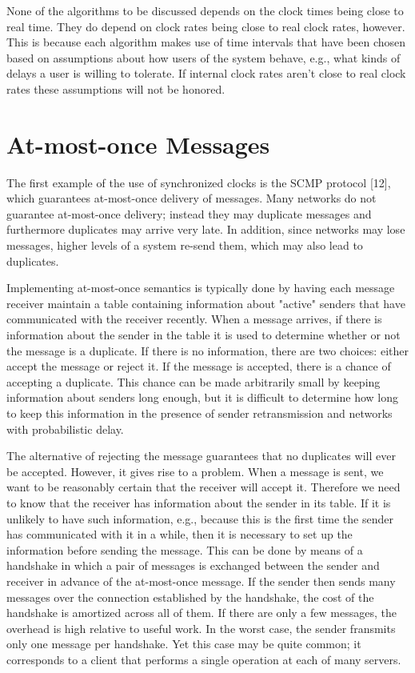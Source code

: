 \documentclass[a4paper,11pt,notitlepage,twoside,openright]{article}
\begin{document}
None of the algorithms to be discussed depends on the clock times being
close to real time. They do depend on clock rates being close to real
clock rates, however. This is because each algorithm makes use of time
intervals that have been chosen based on assumptions about how users of
the system behave, e.g., what kinds of delays a user is willing to
tolerate. If internal clock rates aren't close to real clock rates these
assumptions will not be honored.


\hypertarget{at-most-once-messages}{%
\section{At-most-once Messages}\label{at-most-once-messages}}


The first example of the use of synchronized clocks is the SCMP protocol
{[}12{]}, which guarantees at-most-once delivery of messages. Many
networks do not guarantee at-most-once delivery; instead they may
duplicate messages and furthermore duplicates may arrive very late. In
addition, since networks may lose messages, higher levels of a system
re-send them, which may also lead to duplicates.

Implementing at-most-once semantics is typically done by having each
message receiver maintain a table containing information about "active"
senders that have communicated with the receiver recently. When a
message arrives, if there is information about the sender in the table
it is used to determine whether or not the message is a duplicate. If
there is no information, there are two choices: either accept the
message or reject it. If the message is accepted, there is a chance of
accepting a duplicate. This chance can be made arbitrarily small by
keeping information about senders long enough, but it is difficult to
determine how long to keep this information in the presence of sender
retransmission and networks with probabilistic delay.

The alternative of rejecting the message guarantees that no duplicates
will ever be accepted. However, it gives rise to a problem. When a
message is sent, we want to be reasonably certain that the receiver will
accept it. Therefore we need to know that the receiver has information
about the sender in its table. If it is unlikely to have such
information, e.g., because this is the first time the sender has
communicated with it in a while, then it is necessary to set up the
information before sending the message. This can be done by means of a
handshake in which a pair of messages is exchanged between the sender
and receiver in advance of the at-most-once message. If the sender then
sends many messages over the connection established by the handshake,
the cost of the handshake is amortized across all of them. If there are
only a few messages, the overhead is high relative to useful work. In
the worst case, the sender fransmits only one message per handshake. Yet
this case may be quite common; it corresponds to a client that performs
a single operation at each of many servers.
\end{document}
